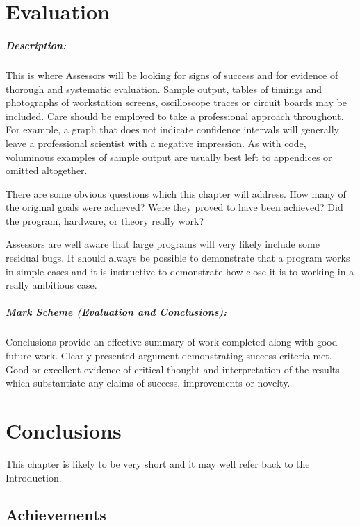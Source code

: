 \documentclass[12pt,a4paper,twoside,openright]{report}
\begin{document}
\chapter{Evaluation}

\paragraph{Description:}
This is where Assessors will be looking for signs of success and for evidence of thorough and systematic evaluation.
Sample output, tables of timings and photographs of workstation screens, oscilloscope traces or circuit boards may be included.
Care should be employed to take a professional approach throughout.
For example, a graph that does not indicate confidence intervals will generally leave a professional scientist with a negative impression. 
As with code, voluminous examples of sample output are usually best left to appendices or omitted altogether.
\par
There are some obvious questions which this chapter will address. How many of the original goals were achieved? Were they proved to have been achieved? Did the program, hardware, or theory really work?
\par
Assessors are well aware that large programs will very likely include some residual bugs. It should always be possible to demonstrate that a program works in simple cases and it is instructive to demonstrate how close it is to working in a really ambitious case.

\paragraph{Mark Scheme (Evaluation and Conclusions): }
Conclusions provide an effective summary of work completed along with good future work.
Clearly presented argument demonstrating success criteria met.
Good or excellent evidence of critical thought and interpretation of the results which substantiate any claims of success, improvements or novelty.


\chapter{Conclusions}
This chapter is likely to be very short and it may well refer back to the Introduction. 
\section{Achievements}
\end{document}
